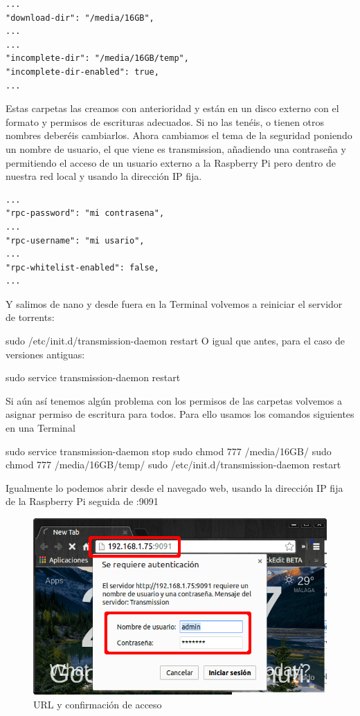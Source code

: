 \documentclass{article}
\begin{document}
\begin{lstlisting}[frame=single,framesep=7pt]
...
"download-dir": "/media/16GB",
...
...
"incomplete-dir": "/media/16GB/temp",
"incomplete-dir-enabled": true,
...
\end{lstlisting}

Estas carpetas las creamos con anterioridad y están en un disco externo con el formato y permisos de escrituras adecuados. Si no las tenéis, o tienen otros nombres deberéis cambiarlos. Ahora cambiamos el tema de la seguridad poniendo un nombre de usuario, el que viene es transmission, añadiendo una contraseña y permitiendo el acceso de un usuario externo a la Raspberry Pi pero dentro de nuestra red local y usando la dirección IP fija.

\begin{lstlisting}[frame=single,framesep=7pt]
...
"rpc-password": "mi contrasena",
...
"rpc-username": "mi usario",
...
"rpc-whitelist-enabled": false,
...
\end{lstlisting}

Y salimos de nano y desde fuera en la Terminal volvemos a reiniciar el servidor de torrents:

sudo /etc/init.d/transmission-daemon restart
O igual que antes, para el caso de versiones antiguas:

sudo service transmission-daemon restart

Si aún así tenemos algún problema con los permisos de las carpetas volvemos a asignar permiso de escritura para todos. Para ello usamos los comandos siguientes en una Terminal

sudo service transmission-daemon stop
sudo chmod 777 /media/16GB/
sudo chmod 777 /media/16GB/temp/
sudo /etc/init.d/transmission-daemon restart

Igualmente lo podemos abrir desde el navegado web, usando la dirección IP fija de la Raspberry Pi seguida de :9091

\begin{figure}[h!]
\centering
\includegraphics[scale=0.5]{torrent19.png}
\caption{URL y confirmación de acceso}
\label{fig:torrent1}
\end{figure}
\end{document}
